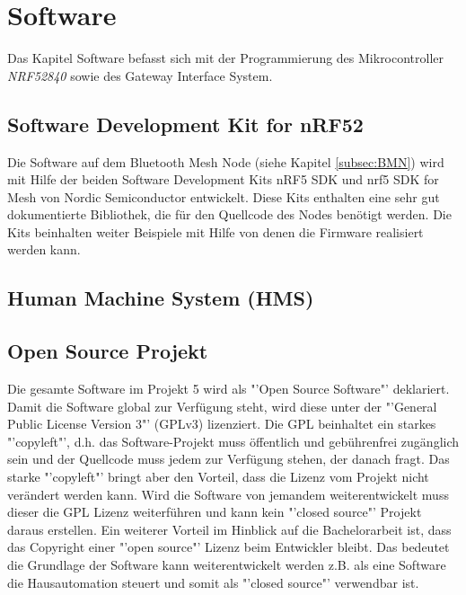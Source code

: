 \clearpage
\section{Software}\label{sec:Software}
Das Kapitel Software befasst sich mit der Programmierung des Mikrocontroller \textit{NRF52840} sowie des Gateway Interface System.

\subsection{Software Development Kit for nRF52}\label{subsec:SDK}
Die Software auf dem Bluetooth Mesh Node (siehe Kapitel \ref{subsec:BMN})  wird mit Hilfe der beiden Software Development Kits nRF5 SDK\cite{nordic_semiconductor_nrf5_2019} und nrf5 SDK for Mesh\cite{nordic_semiconductor_nrf5_2019-1} von Nordic Semiconductor entwickelt. Diese Kits enthalten eine sehr gut dokumentierte Bibliothek, die für den Quellcode des Nodes benötigt werden. Die Kits beinhalten weiter Beispiele mit Hilfe von denen die Firmware realisiert werden kann.

\subsection{Human Machine System (HMS)}\label{subsec:HMS_SW}

\subsection{Open Source Projekt}\label{subsec:OSP}
Die gesamte Software im Projekt 5 wird als "'Open Source Software"' deklariert. Damit die Software global zur Verfügung steht, wird diese unter der "'General Public License Version 3"' (GPLv3) lizenziert. Die GPL beinhaltet ein starkes "'copyleft"', d.h. das Software-Projekt muss öffentlich und gebührenfrei zugänglich sein und der Quellcode muss jedem zur Verfügung stehen, der danach fragt. Das starke "'copyleft"' bringt aber den Vorteil, dass die Lizenz vom Projekt nicht verändert werden kann. Wird die Software von jemandem weiterentwickelt muss dieser die GPL Lizenz weiterführen und kann kein "'closed source"' Projekt daraus erstellen. Ein weiterer Vorteil im Hinblick auf die Bachelorarbeit ist, dass das Copyright einer "'open source"' Lizenz beim Entwickler bleibt. Das bedeutet die Grundlage der Software kann weiterentwickelt werden z.B. als eine Software die Hausautomation steuert und somit als "'closed source"' verwendbar ist.\cite{jaeger_was_2018}